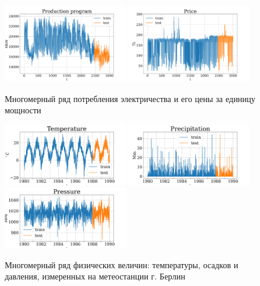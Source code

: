 			\begin{figure}[h]
				\centering
				\includegraphics[width=0.48\textwidth, keepaspectratio]{../figs/Electricity_Production}
				\includegraphics[width=0.48\textwidth, keepaspectratio]{../figs/Electricity_Price}
				\caption{Многомерный ряд потребления электричества и его цены за единицу мощности}\label{fig:electr_data}
			\end{figure}
			
			\begin{figure}[h]
				\centering
				\includegraphics[width=0.48\textwidth, keepaspectratio]{../figs/Temperature.png}
				\includegraphics[width=0.48\textwidth, keepaspectratio]{../figs/Precipitation.png}
				\includegraphics[width=0.48\textwidth, keepaspectratio]{../figs/Pressure.png}
				\caption{Многомерный ряд физических величин: температуры, осадков и давления, измеренных на метеостанции г. Берлин}\label{fig:weather_data}
			\end{figure}
			
